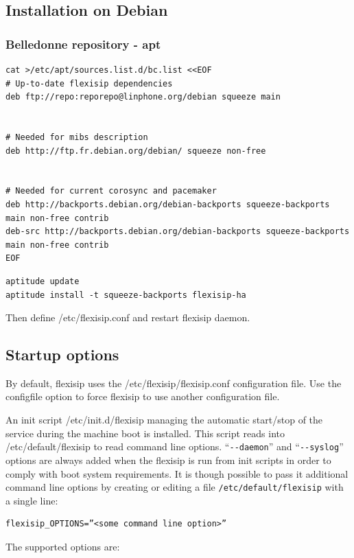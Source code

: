 \documentclass[a4paper,10pt]{article}
\begin{document}
\subsection{Installation on Debian}
\subsubsection{Belledonne repository - apt}
\begin{verbatim}
cat >/etc/apt/sources.list.d/bc.list <<EOF
# Up-to-date flexisip dependencies
deb ftp://repo:reporepo@linphone.org/debian squeeze main


# Needed for mibs description
deb http://ftp.fr.debian.org/debian/ squeeze non-free


# Needed for current corosync and pacemaker
deb http://backports.debian.org/debian-backports squeeze-backports main non-free contrib
deb-src http://backports.debian.org/debian-backports squeeze-backports main non-free contrib
EOF
\end{verbatim} 

\begin{verbatim}
aptitude update
aptitude install -t squeeze-backports flexisip-ha
\end{verbatim}


Then define /etc/flexisip.conf and restart flexisip daemon.


\subsection{Startup options}
By default, flexisip uses the /etc/flexisip/flexisip.conf configuration file.
Use the configfile option to force flexisip to use another configuration file.

An init script /etc/init.d/flexisip managing the automatic start/stop of the service during the machine boot is installed.
This script reads into /etc/default/flexisip to read command line options. “\verb|--daemon|” and “\verb|--syslog|” options are always added when the flexisip is run from init scripts in order to comply with boot system requirements.
It is though possible to pass it additional command line options by creating or editing a file \verb|/etc/default/flexisip| with a single line:
\begin{verbatim}
flexisip_OPTIONS=”<some command line option>” 
\end{verbatim}


The supported options are:

\end{document}
